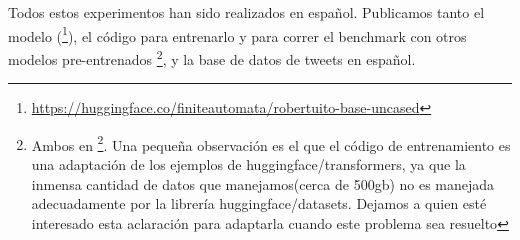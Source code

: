 Todos estos experimentos han sido realizados en español. Publicamos tanto el modelo \robertuito{}(\footnote{\url{https://huggingface.co/finiteautomata/robertuito-base-uncased}}), el código para entrenarlo y para correr el benchmark con otros modelos pre-entrenados \footnote{Ambos en  \footnote{\url{https://github.com/pysentimiento/robertuito}}. Una pequeña observación es el que el código de entrenamiento es una adaptación de los ejemplos de huggingface/transformers, ya que la inmensa cantidad de datos que manejamos(cerca de 500gb) no es manejada adecuadamente por la librería huggingface/datasets. Dejamos a quien esté interesado esta aclaración para adaptarla cuando este problema sea resuelto}, y la base de datos de tweets en español.
